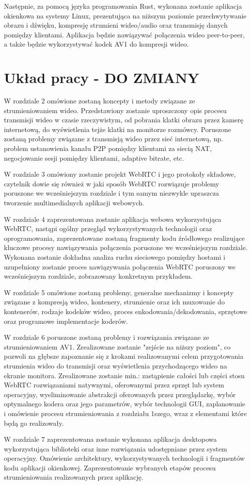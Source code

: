 Następnie, za pomocą języka programowania Rust, wykonana zostanie aplikacja okienkowa na systemy
Linux, prezentująca na niższym poziomie przechwytywanie obrazu i dźwięku, kompresję strumieni
wideo/audio oraz transmisję danych pomiędzy klientami. Aplikacja będzie nawiązywać połączenia wideo
peer-to-peer, a także będzie wykorzystywać kodek AV1 do kompresji wideo.

\section{Układ pracy - DO ZMIANY}

W rozdziale 2 omówione zostaną koncepty i metody związane ze strumieniowaniem wideo. Przedstawiony
zostanie uproszczony opis procesu transmisji wideo w czasie rzeczywistym, od pobrania klatki obrazu
przez kamerę internetową, do wyświetlenia tejże klatki na monitorze rozmówcy. Poruszone zostaną
problemy związane z transmisją wideo przez sieć internetową, np. problem ustanowienia kanału P2P
pomiędzy klientami za siecią NAT, negocjowanie sesji pomiędzy klientami, adaptive bitrate, etc.

W rozdziale 3 omówiony zostanie projekt WebRTC i jego protokoły składowe, czytelnik dowie się
również w jaki sposób WebRTC rozwiązuje problemy poruszone we wcześniejszym rozdziale i tym samym
niezwykle upraszcza tworzenie multimedialnych aplikacji webowych.

W rozdziale 4 zaprezentowana zostanie aplikacja webowa wykorzystująca WebRTC, nastąpi ogólny
przegląd wykorzystywanych technologii oraz oprogramowania, zaprezentowane zostaną fragmenty kodu
źródłowego realizujące kluczowe procesy nawiązywania połączenia poruszone we wcześniejszym
rozdziale. Wykonana zostanie dokładna analiza ruchu sieciowego pomiędzy hostami i uzupełniony
zostanie proces nawiązywania połączenia WebRTC poruszony we wcześniejszym rozdziale, zobrazowany
konkretnym przykładem.

W rozdziale 5 omówione zostaną problemy, generalne mechanizmy i koncepty związane z kompresją wideo,
kontenery, strumienie oraz ich muxowanie do kontenerów, rodzaje kodeków wideo, proces
enkodowania/dekodowania, sprzętowe oraz programowe implementacje koderów.

W rozdziale 6 poruszone zostaną problemy i rozwiązania związane ze strumieniowaniem AV1.
Zrealizowane zostanie "zejście na niższy poziom", co pozwoli na głębsze zapoznanie się z krokami
realizowanymi celem przygotowania strumienia wideo do transmisji oraz wyświetlenia przychodzącego
wideo na ekranie monitora. Zrealizowane zostanie min.: zastąpienie całości lub części stosu WebRTC
rozwiązaniami natywnymi, oferowanymi przez sprzęt lub system operacyjny, wyeliminowanie abstrakcji
oferowanych przez przeglądarkę, wybór optymalnego kodera oraz jego parametrów, wybór technologii
GUI, zaplanowanie i omówienie procesu strumieniowania z rozdziału 1szego, wraz z elementami które
będą go realizowały.

W rozdziale 7 zaprezentowana zostanie wykonana aplikacja desktopowa wykorzystująca biblioteki oraz
inne rozwiązania udostępniane przez system operacyjny. Omówienie architektury, wykorzystywanych
technologii i fragmentów kodu aplikacji okienkowej. Zaprezentowanie wybranych etapów procesu
strumieniowania realizowanych przez aplikację.
